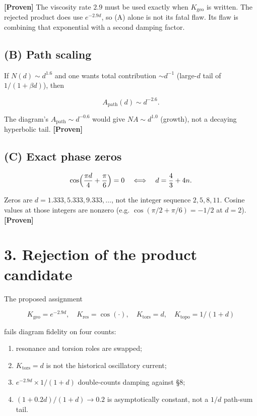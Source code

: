 \documentclass[11pt,a4paper,openany]{report}
\newcommand{\statusProven}{\textcolor{fingreen}{[Proven]}}
\begin{document}
\textbf{\statusProven{}} The viscosity rate \(2.9\) must be used exactly when \(K_{\mathrm{geo}}\) is written. The rejected product does use \(e^{-2.9d}\), so (A) alone is not its fatal flaw. Its flaw is combining that exponential with a second damping factor.

\subsection{(B) Path scaling}

If \(N(d)\sim d^{1.6}\) and one wants total contribution \(\sim d^{-1}\) (large-\(d\) tail of \(1/(1+\beta d)\)), then

\[
A_{\mathrm{path}}(d)\sim d^{-2.6}.
\]

The diagram’s \(A_{\mathrm{path}}\sim d^{-0.6}\) would give \(N A\sim d^{1.0}\) (growth), not a decaying hyperbolic tail. \textbf{\statusProven{}}

\subsection{(C) Exact phase zeros}

\[
\cos\Bigl(\frac{\pi d}{4}+\frac{\pi}{6}\Bigr)=0
\quad\Longleftrightarrow\quad
d=\frac43+4n.
\]

Zeros are \(d=1.333,5.333,9.333,\ldots\), not the integer sequence \(2,5,8,11\). Cosine values at those integers are nonzero (e.g. \(\cos(\pi/2+\pi/6)=-1/2\) at \(d=2\)). \textbf{\statusProven{}}

\section{3. Rejection of the product candidate}

The proposed assignment

\[
K_{\mathrm{geo}}=e^{-2.9d},\quad
K_{\mathrm{res}}=\cos(\cdot),\quad
K_{\mathrm{tors}}=d,\quad
K_{\mathrm{topo}}=1/(1+d)
\]

fails diagram fidelity on four counts:

\begin{enumerate}
\item 
resonance and torsion roles are swapped;

\item 
\(K_{\mathrm{tors}}=d\) is not the historical oscillatory current;

\item 
\(e^{-2.9d}\times 1/(1+d)\) double-counts damping against §8;

\item 
\((1+0.2d)/(1+d)\to 0.2\) is asymptotically constant, not a \(1/d\) path-sum tail.

\end{enumerate}
\end{document}
